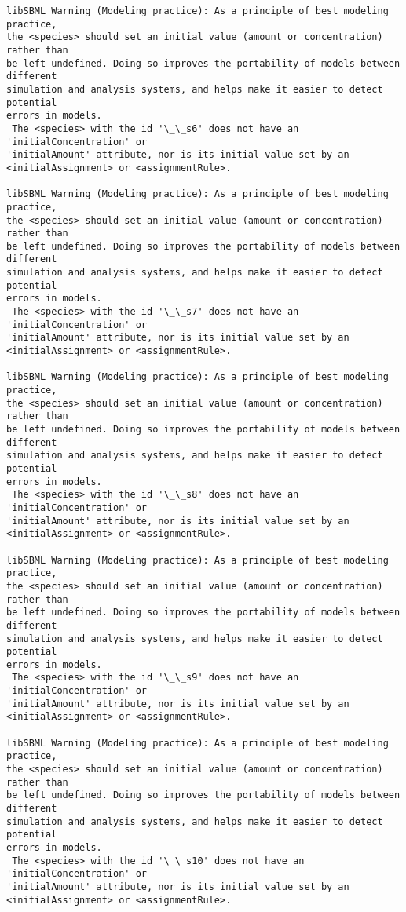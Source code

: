 \documentclass[11pt]{article}
\begin{document}
    \begin{Verbatim}[commandchars=\\\{\}]
libSBML Warning (Modeling practice): As a principle of best modeling practice,
the <species> should set an initial value (amount or concentration) rather than
be left undefined. Doing so improves the portability of models between different
simulation and analysis systems, and helps make it easier to detect potential
errors in models.
 The <species> with the id '\_\_s6' does not have an 'initialConcentration' or
'initialAmount' attribute, nor is its initial value set by an
<initialAssignment> or <assignmentRule>.

libSBML Warning (Modeling practice): As a principle of best modeling practice,
the <species> should set an initial value (amount or concentration) rather than
be left undefined. Doing so improves the portability of models between different
simulation and analysis systems, and helps make it easier to detect potential
errors in models.
 The <species> with the id '\_\_s7' does not have an 'initialConcentration' or
'initialAmount' attribute, nor is its initial value set by an
<initialAssignment> or <assignmentRule>.

libSBML Warning (Modeling practice): As a principle of best modeling practice,
the <species> should set an initial value (amount or concentration) rather than
be left undefined. Doing so improves the portability of models between different
simulation and analysis systems, and helps make it easier to detect potential
errors in models.
 The <species> with the id '\_\_s8' does not have an 'initialConcentration' or
'initialAmount' attribute, nor is its initial value set by an
<initialAssignment> or <assignmentRule>.

libSBML Warning (Modeling practice): As a principle of best modeling practice,
the <species> should set an initial value (amount or concentration) rather than
be left undefined. Doing so improves the portability of models between different
simulation and analysis systems, and helps make it easier to detect potential
errors in models.
 The <species> with the id '\_\_s9' does not have an 'initialConcentration' or
'initialAmount' attribute, nor is its initial value set by an
<initialAssignment> or <assignmentRule>.

libSBML Warning (Modeling practice): As a principle of best modeling practice,
the <species> should set an initial value (amount or concentration) rather than
be left undefined. Doing so improves the portability of models between different
simulation and analysis systems, and helps make it easier to detect potential
errors in models.
 The <species> with the id '\_\_s10' does not have an 'initialConcentration' or
'initialAmount' attribute, nor is its initial value set by an
<initialAssignment> or <assignmentRule>.


\end{Verbatim}
\end{document}
